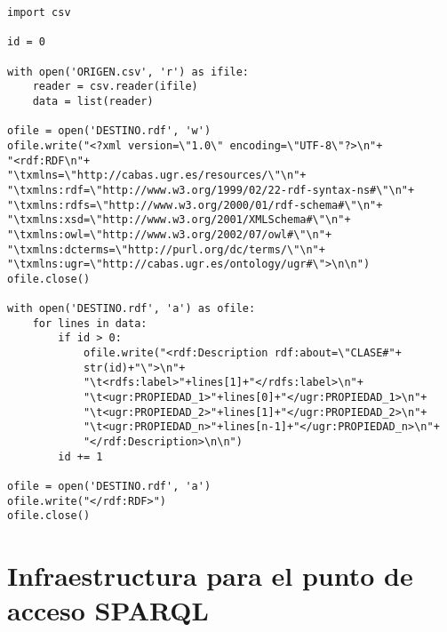 \newpage
\begin{verbatim}
import csv

id = 0

with open('ORIGEN.csv', 'r') as ifile:
    reader = csv.reader(ifile)
    data = list(reader)

ofile = open('DESTINO.rdf', 'w')
ofile.write("<?xml version=\"1.0\" encoding=\"UTF-8\"?>\n"+
"<rdf:RDF\n"+
"\txmlns=\"http://cabas.ugr.es/resources/\"\n"+
"\txmlns:rdf=\"http://www.w3.org/1999/02/22-rdf-syntax-ns#\"\n"+
"\txmlns:rdfs=\"http://www.w3.org/2000/01/rdf-schema#\"\n"+
"\txmlns:xsd=\"http://www.w3.org/2001/XMLSchema#\"\n"+
"\txmlns:owl=\"http://www.w3.org/2002/07/owl#\"\n"+
"\txmlns:dcterms=\"http://purl.org/dc/terms/\"\n"+
"\txmlns:ugr=\"http://cabas.ugr.es/ontology/ugr#\">\n\n")
ofile.close()

with open('DESTINO.rdf', 'a') as ofile:
    for lines in data:
        if id > 0:
            ofile.write("<rdf:Description rdf:about=\"CLASE#"+
            str(id)+"\">\n"+
            "\t<rdfs:label>"+lines[1]+"</rdfs:label>\n"+
            "\t<ugr:PROPIEDAD_1>"+lines[0]+"</ugr:PROPIEDAD_1>\n"+
            "\t<ugr:PROPIEDAD_2>"+lines[1]+"</ugr:PROPIEDAD_2>\n"+
            "\t<ugr:PROPIEDAD_n>"+lines[n-1]+"</ugr:PROPIEDAD_n>\n"+
            "</rdf:Description>\n\n")
        id += 1

ofile = open('DESTINO.rdf', 'a')
ofile.write("</rdf:RDF>")
ofile.close()
\end{verbatim}

\section{Infraestructura para el punto de acceso SPARQL}